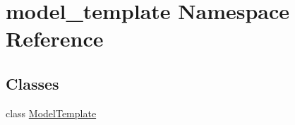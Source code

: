 \hypertarget{namespacemodel__template}{\section{model\-\_\-template Namespace Reference}
\label{namespacemodel__template}
}
\subsection*{Classes}
\begin{DoxyCompactItemize}
\item 
class \hyperlink{classmodel__template_1_1_model_template}{Model\-Template}
\end{DoxyCompactItemize}
